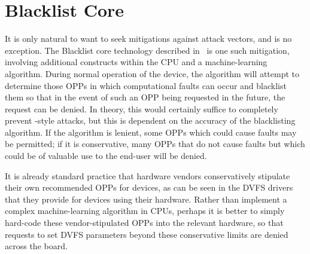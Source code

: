 \section{Blacklist Core}

It is only natural to want to seek mitigations against attack vectors, and
\clkscrew{} is no exception. The Blacklist core technology described
in~\cite{blacklistCore} is one such mitigation, involving additional constructs
within the CPU and a machine-learning algorithm. During normal operation of the
device, the algorithm will attempt to determine those OPPs in which
computational faults can occur and blacklist them so that in the event of such
an OPP being requested in the future, the request can be denied. In theory, this
would certainly suffice to completely prevent \clkscrew{}-style attacks, but
this is dependent on the accuracy of the blacklisting algorithm. If the
algorithm is lenient, some OPPs which could cause faults may be permitted; if
it is conservative, many OPPs that do not cause faults but which could be of
valuable use to the end-user will be denied.

It is already standard practice that hardware vendors conservatively stipulate
their own recommended OPPs for devices, as can be seen in the DVFS drivers that
they provide for devices using their hardware. Rather than implement a complex
machine-learning algorithm in CPUs, perhaps it is better to simply hard-code
these vendor-stipulated OPPs into the relevant hardware, so that requests to
set DVFS parameters beyond these conservative limits are denied across the
board.
